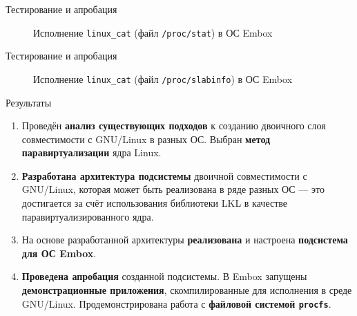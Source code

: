 \documentclass[english,russian,aspectratio=169]{beamer}
\begin{document}
\begin{frame}{Тестирование и апробация}
\begin{figure}[h]
\caption{Исполнение \textcolor{MyGrey}{\texttt{linux\_cat}} (файл \textcolor{MyGrey}{\texttt{/proc/stat}}) в ОС Embox}
\end{figure}
\end{frame}

\begin{frame}{Тестирование и апробация}
\begin{figure}[h]
\caption{Исполнение \textcolor{MyGrey}{\texttt{linux\_cat}} (файл \textcolor{MyGrey}{\texttt{/proc/slabinfo}}) в ОС Embox}
\end{figure}
\end{frame}

\begin{frame}[t]{Результаты}
\begin{enumerate}
  \item Проведён \textbf{анализ существующих подходов} к созданию двоичного слоя\newline
  совместимости с GNU/Linux в разных ОС. Выбран \textbf{метод паравиртуализации} ядра Linux.
  \item \textbf{Разработана архитектура подсистемы} двоичной совместимости с GNU/Linux, которая может быть реализована в ряде разных ОС --- это достигается за счёт использования библиотеки LKL в качестве паравиртуализированного ядра.
  \item На основе разработанной архитектуры \textbf{реализована} и настроена \textbf{подсистема для ОС Embox}.
  \item \textbf{Проведена апробация} созданной подсистемы. В Embox запущены\newline
  \textbf{демонстрационные приложения}, скомпилированные для исполнения в среде GNU/Linux. Продемонстрирована работа с \textbf{файловой системой \textcolor{MyGrey}{\texttt{procfs}}}.
\end{enumerate}
\end{frame}
\end{document}
